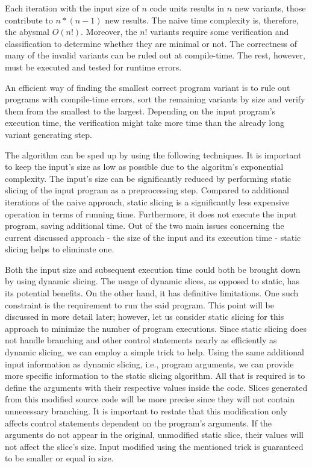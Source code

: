Each iteration with the input size of $n$ code units results in $n$ new 
variants, those contribute to $n * (n - 1) $ new results.
The naive time complexity is, therefore, the abysmal $O(n!)$.
Moreover, the $n!$ variants require some verification and classification 
to determine whether they are minimal or not.
The correctness of many of the invalid variants can be ruled out at 
compile-time.
The rest, however, must be executed and tested for runtime errors.

An efficient way of finding the smallest correct program variant is to rule 
out programs with compile-time errors, sort the remaining variants by size 
and verify them from the smallest to the largest.
Depending on the input program's execution time, the verification might take 
more time than the already long variant generating step.

The algorithm can be sped up by using the following techniques.
It is important to keep the input's size as low as possible due to the 
algoritm's exponential complexity.
The input's size can be significantly reduced by performing static 
slicing of the input program as a preprocessing step.
Compared to additional iterations of the naive approach, static slicing is 
a significantly less expensive operation in terms of running time.
Furthermore, it does not execute the input program, saving additional time.
Out of the two main issues concerning the current discussed approach - 
the size of the input and its execution time - static slicing helps 
to eliminate one.

Both the input size and subsequent execution time could both be brought 
down by using dynamic slicing.
The usage of dynamic slices, as opposed to static, has its potential benefits.
On the other hand, it has definitive limitations.
One such constraint is the requirement to run the said program.
This point will be discussed in more detail later; however, let us consider 
static slicing for this approach to minimize the number of program executions.
Since static slicing does not handle branching and other control statements 
nearly as efficiently as dynamic slicing, we can employ a simple trick 
to help.
Using the same additional input information as dynamic slicing, i.e., 
program arguments, we can provide more specific information 
to the static slicing algorithm.
All that is required is to define the arguments with their respective 
values inside the code.
Slices generated from this modified source code will be more precise 
since they will not contain unnecessary branching.
It is important to restate that this modification only affects control 
statements dependent on the program's arguments.
If the arguments do not appear in the original, unmodified static slice, 
their values will not affect the slice's size.
Input modified using the mentioned trick is guaranteed to be smaller or 
equal in size.

